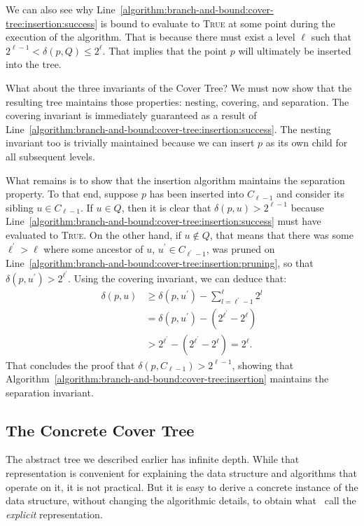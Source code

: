 We can also see why Line~\ref{algorithm:branch-and-bound:cover-tree:insertion:success} is bound to
evaluate to \textsc{True} at some point during the execution of the algorithm.
That is because there must exist a level $\ell$ such that $2^{\ell - 1} < \delta(p, Q) \leq 2^\ell$.
That implies that the point $p$ will ultimately be inserted into the tree.

What about the three invariants of the Cover Tree? We must now show that the resulting
tree maintains those properties: nesting, covering, and separation.
The covering invariant is immediately guaranteed as a result of Line~\ref{algorithm:branch-and-bound:cover-tree:insertion:success}. The nesting invariant too is trivially maintained because
we can insert $p$ as its own child for all subsequent levels.

What remains is to show that the insertion algorithm maintains the separation property. 
To that end, suppose $p$ has been inserted into $C_{\ell-1}$ and consider 
its sibling $u \in C_{\ell-1}$. If $u \in Q$, then it is clear that
$\delta(p, u) > 2^{\ell - 1}$ because Line~\ref{algorithm:branch-and-bound:cover-tree:insertion:success}
must have evaluated to \textsc{True}. On the other hand, if $u \notin Q$,
that means that there was some $\ell^\prime > \ell$ where some ancestor of
$u$, $u^\prime \in C_{\ell^\prime - 1}$, was pruned on
Line~\ref{algorithm:branch-and-bound:cover-tree:insertion:pruning},
so that $\delta(p, u^\prime) > 2^{\ell^\prime}$.
Using the covering invariant, we can deduce that:
\begin{align*}
    \delta(p, u) &\geq \delta(p, u^\prime) - \sum_{l = \ell^\prime - 1}^{\ell} 2^l \\
    &= \delta(p, u^\prime) - (2^{\ell^\prime} - 2^\ell) \\
    &> 2^{\ell^\prime} - (2^{\ell^\prime} - 2^\ell) = 2^\ell.
\end{align*}
That concludes the proof that $\delta(p, C_{\ell - 1}) > 2^{\ell - 1}$,
showing that Algorithm~\ref{algorithm:branch-and-bound:cover-tree:insertion} maintains
the separation invariant.

\subsection{The Concrete Cover Tree}
The abstract tree we described earlier has infinite depth. While that representation
is convenient for explaining the data structure and algorithms that operate on it,
it is not practical. But it is easy to derive a concrete instance of the data structure,
without changing the algorithmic details, to obtain what~\cite{covertrees}
call the \emph{explicit} representation.

